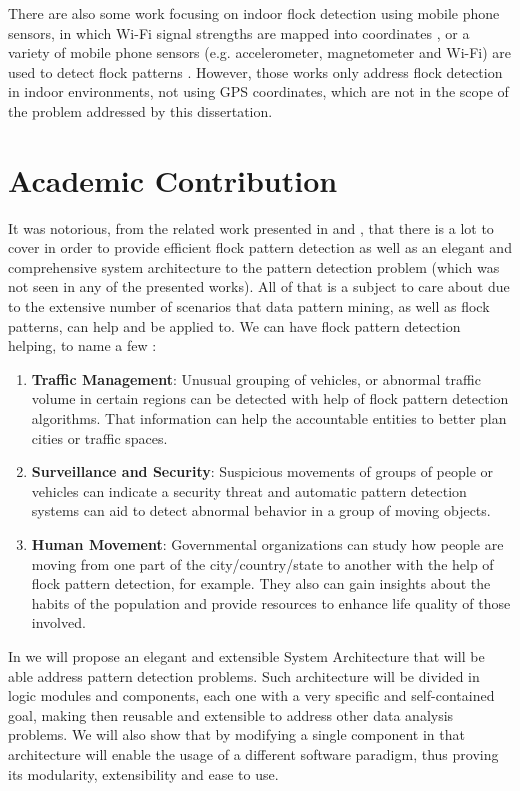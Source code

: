 There are also some work focusing on indoor flock detection using mobile phone sensors, in which Wi-Fi signal strengths
are mapped into coordinates \citep{mobile1}, or a variety of mobile phone sensors (e.g. accelerometer, magnetometer and
Wi-Fi) are used to detect flock patterns \citep{mobile2}. However, those works only address flock detection in indoor
environments, not using GPS coordinates, which are not in the scope of the problem addressed by this dissertation.

\section{Academic Contribution}
It was notorious, from the related work presented in  and , that there is
a lot to cover in order to provide efficient flock pattern detection as well as an elegant and comprehensive system
architecture to the pattern detection problem (which was not seen in any of the presented works). All of that is a
subject to care about due to the extensive number of scenarios that data pattern mining, as well as flock patterns, can
help and be applied to. We can have flock pattern detection helping, to name a few \citep{applications}:

\begin{enumerate}
    \item \textbf{Traffic Management}: Unusual grouping of vehicles, or abnormal traffic volume in certain regions can
        be detected with help of flock pattern detection algorithms. That information can help the accountable entities
        to better plan cities or traffic spaces.
    \item \textbf{Surveillance and Security}: Suspicious movements of groups of people or vehicles can indicate a
        security threat and automatic pattern detection systems can aid to detect abnormal behavior in a group of moving
        objects.
    \item \textbf{Human Movement}: Governmental organizations can study how people are moving from one part of the
        city/country/state to another with the help of flock pattern detection, for example. They also can gain insights
        about the habits of the population and provide resources to enhance life quality of those involved.
\end{enumerate}

In  we will propose an elegant and extensible System Architecture that will be able address
pattern detection problems. Such architecture will be divided in logic modules and components, each one with a very
specific and self-contained goal, making then reusable and extensible to address other data analysis problems. We will
also show that by modifying a single component in that architecture will enable the usage of a different software
paradigm, thus proving its modularity, extensibility and ease to use.

